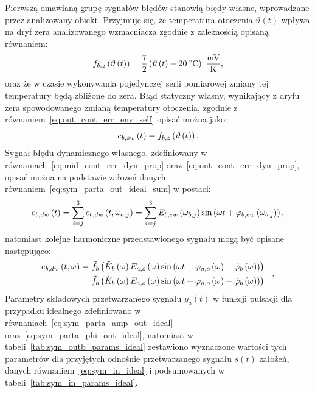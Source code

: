Pierwszą omawianą grupę sygnałów błędów stanowią błędy własne, wprowadzane przez analizowany obiekt. Przyjmuje się, że temperatura otoczenia $\vartheta(t)$ wpływa na dryf zera analizowanego wzmacniacza zgodnie z zależnością opisaną równaniem:
\begin{equation}
f_{b,z} \left( \vartheta \emb{t} \right) = \frac{7}{2} \left( \vartheta \emb{t} - \qty{20}{\degreeCelsius} \right)~\unit{\frac{mV}{K}} \label{eq:sym_partb_temp_err},
\end{equation}
oraz że w czasie wykonywania pojedynczej serii pomiarowej zmiany tej temperatury będą zbliżone do zera. Błąd statyczny własny, wynikający z dryfu zera spowodowanego zmianą temperatury otoczenia, zgodnie z równaniem~\eqref{eq:out_cont_err_env_self} opisać można jako:
\begin{equation}
e_{b,sw} \left(t\right) = f_{b,z} \left( \vartheta \left(t\right) \right) \label{eq:sym_partb_err_sw}.
\end{equation}
Sygnał błędu dynamicznego własnego, zdefiniowany w równaniach~\eqref{eq:mid_cont_err_dyn_prop} oraz~\eqref{eq:out_cont_err_dyn_prop}, opisać można na podstawie założeń danych równaniem~\eqref{eq:sym_parta_out_ideal_sum} w postaci:
\begin{equation}
e_{b,dw} \left(t\right) = \sum _{i = j} ^{3} e_{b,dw} \left(t,\omega_{a,j}\right) = \sum _{i = j} ^{3} E_{b,ew} \left(\omega_{b,j}\right) \sin \left(\omega t + \varphi_{b,ew} \left(\omega_{b,j}\right)\right) \label{eq:sym_partb_dyn_self_sum},
\end{equation}
natomiast kolejne harmoniczne przedstawionego sygnału mogą być opisane następująco:
\begin{equation}
\begin{split}
e_{b,dw} \left(t,\omega\right) =~
& \tilde{f}_{b} \left( \tilde{K}_{b} \left(\omega\right) E_{a,o} \left(\omega\right) \sin \left( \omega t + \varphi_{a,o} \left(\omega\right) + \tilde{\varphi}_{b} \left(\omega\right) \right) \right)- \\
& \tilde{f}_{b} \left( \dot{K}_{b} \left(\omega\right) E_{a,o} \left(\omega\right) \sin \left( \omega t + \varphi_{a,o} \left(\omega\right) + \dot{\varphi}_{b} \left(\omega\right) \right) \right)
\end{split}
\label{eq:sym_partb_dyn_self_err}.
\end{equation}
Parametry składowych przetwarzanego sygnału $y_{a}(t)$ w funkcji pulsacji dla przypadku idealnego zdefiniowano w równaniach~\eqref{eq:sym_parta_amp_out_ideal} oraz~\eqref{eq:sym_parta_phi_out_ideal}, natomiast w tabeli~\ref{tab:sym_outb_params_ideal} zestawiono wyznaczone wartości tych parametrów dla przyjętych odnośnie przetwarzanego sygnału $s(t)$ założeń, danych równaniem~\eqref{eq:sym_in_ideal} i podsumowanych w tabeli~\ref{tab:sym_in_params_ideal}.

